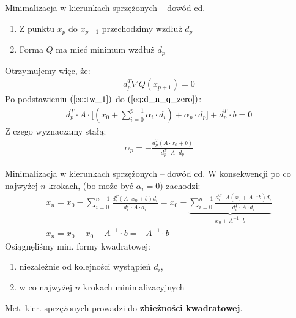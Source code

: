   \begin{frame}{Minimalizacja w kierunkach sprzężonych -- dowód cd.}
    \begin{enumerate}
      \item Z punktu $x_p$ do $x_{p + 1}$ przechodzimy wzdłuż $d_p$
      \item Forma $Q$ ma mieć minimum wzdłuż $d_p$
    \end{enumerate}
    Otrzymujemy więc, że:
    \begin{equation}\label{eq:d_n_q_zero}
        \begin{aligned}
          d_p^T \nabla Q(x_{p + 1}) = 0
        \end{aligned}
    \end{equation}
    Po podstawieniu $(\ref{eq:tw_1})$ do $(\ref{eq:d_n_q_zero})$:
    \begin{equation*}
        \begin{aligned}
          d_p^T \cdot A \cdot \bigg[(x_0 + \sum_{i = 0}^{p - 1} \alpha_i \cdot d_i) + \alpha_p \cdot d_p \bigg] + d_p^T \cdot b = 0
        \end{aligned}
    \end{equation*}
    Z czego wyznaczamy stałą:
    \begin{equation*}
        \begin{aligned}
          \alpha_p = - \frac{d_p^T (A \cdot x_0 + b)}{d_p^T \cdot A \cdot d_p}
        \end{aligned}
    \end{equation*}
  \end{frame}

  \begin{frame}{Minimalizacja w kierunkach sprzężonych -- dowód cd.}
    W konsekwencji po co najwyżej $n$ krokach, (bo może być $\alpha_i = 0)$ zachodzi:
    \begin{equation*}
        \begin{aligned}
          x_n = x_0 - \sum_{i = 0}^{n - 1} \frac{d_i^T (A \cdot x_0 + b) d_i}{d_i^T \cdot A \cdot d_i} =
          x_0 - \underbrace{\sum_{i = 0}^{n - 1} \frac{d_i^T \cdot A (x_0 + A^{-1} b) d_i}{d_i^T \cdot A \cdot d_i}}_{x_0 + A^{-1} \cdot b}\\
          x_n = x_0 - x_0 - A^{-1} \cdot b = - A^{-1} \cdot b
        \end{aligned}
    \end{equation*}
    Osiągnęliśmy min. formy kwadratowej:
    \begin{enumerate}
      \item niezależnie od kolejności wystąpień $d_i$,
      \item w co najwyżej $n$ krokach minimalizacyjnych
    \end{enumerate}
    Met. kier. sprzężonych prowadzi do \textbf{zbieżności kwadratowej}.
  \end{frame}

